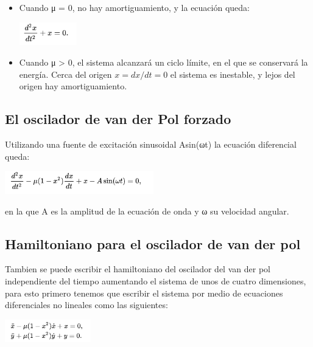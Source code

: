 \documentclass{article}
\begin{document}
\begin{itemize}
\item Cuando μ = 0, no hay amortiguamiento, y la ecuación queda:


\begin{center}
\includegraphics[height=1cm]{fig4.png}
\end{center}


\item

Cuando μ > 0, el sistema alcanzará un ciclo límite, en el que se conservará la energía. Cerca del origen $x = dx/dt = 0$ el sistema es inestable, y lejos del origen hay amortiguamiento.

\end{itemize}

\subsection{El oscilador de van der Pol forzado}

Utilizando una fuente de excitación sinusoidal Asin(ωt) la ecuación diferencial queda:

\begin{center}
\includegraphics[height=1cm]{fig5.png}
\end{center}

en la que A es la amplitud de la ecuación de onda y ω su velocidad angular.


\subsection{Hamiltoniano para el oscilador de van der pol}

Tambien se puede escribir el hamiltoniano del oscilador del van der pol independiente del tiempo aumentando el sistema de unos de cuatro dimensiones, para esto primero tenemos que escribir el sistema por medio de ecuaciones diferenciales no lineales como las siguientes:

\begin{center}
\includegraphics[height=1cm]{fig6.png}
\end{center}
\end{document}
